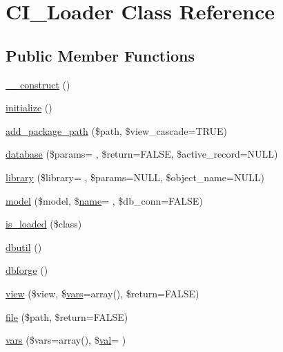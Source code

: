 \hypertarget{class_c_i___loader}{}\section{C\+I\+\_\+\+Loader Class Reference}
\label{class_c_i___loader}
\subsection*{Public Member Functions}
\begin{DoxyCompactItemize}
\item 
\hyperlink{class_c_i___loader_a095c5d389db211932136b53f25f39685}{\+\_\+\+\_\+construct} ()
\item 
\hyperlink{class_c_i___loader_a91098fa7d1917ce4833f284bbef12627}{initialize} ()
\item 
\hyperlink{class_c_i___loader_a8b23f3be0a84aa31df8b715ca841f5cf}{add\+\_\+package\+\_\+path} (\$path, \$view\+\_\+cascade=T\+R\+UE)
\item 
\hyperlink{class_c_i___loader_a22d288c451a7ebb77c814d21a1cb0a1c}{database} (\$params= \textquotesingle{}\textquotesingle{}, \$return=F\+A\+L\+SE, \$active\+\_\+record=N\+U\+LL)
\item 
\hyperlink{class_c_i___loader_a107e711d913e6008ee5f4d557655afd3}{library} (\$library= \textquotesingle{}\textquotesingle{}, \$params=N\+U\+LL, \$object\+\_\+name=N\+U\+LL)
\item 
\hyperlink{class_c_i___loader_a3f2fc35ce58c58b39980136502db18e8}{model} (\$model, \$\hyperlink{user_8php_a765af5e9671743530143a6d3670fd9a6}{name}= \textquotesingle{}\textquotesingle{}, \$db\+\_\+conn=F\+A\+L\+SE)
\item 
\hyperlink{class_c_i___loader_a57ba1b43ec1d58c07a2d1e8cd00b9658}{is\+\_\+loaded} (\$class)
\item 
\hyperlink{class_c_i___loader_afca757331ddb1ee832af732a2f624882}{dbutil} ()
\item 
\hyperlink{class_c_i___loader_a4e719447bdbd4829418772916630949c}{dbforge} ()
\item 
\hyperlink{class_c_i___loader_a338c66f36b2406ff1e14e7d64515b40c}{view} (\$view, \$\hyperlink{class_c_i___loader_a81f52eab55f5b998b1956ea67e58fcc3}{vars}=array(), \$return=F\+A\+L\+SE)
\item 
\hyperlink{class_c_i___loader_a47e4b8eda2bbf9e8bb505cdafb8e4ba5}{file} (\$path, \$return=F\+A\+L\+SE)
\item 
\hyperlink{class_c_i___loader_a81f52eab55f5b998b1956ea67e58fcc3}{vars} (\$vars=array(), \$\hyperlink{jquery_8tokeninput_8js_a21200c34618b8c12c446cd51529ebd8c}{val}= \textquotesingle{}\textquotesingle{})

\end{DoxyCompactItemize}
